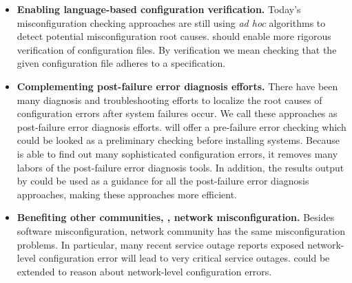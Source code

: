 \begin{itemize}

\item {\bf Enabling language-based configuration verification.}
  Today's misconfiguration checking approaches are still using {\em ad hoc}
  algorithms to detect potential misconfiguration root causes. \app 
  should enable more rigorous verification of configuration files. By verification we
  mean checking that the given configuration file adheres to a
  specification.

\item {\bf Complementing post-failure error diagnosis efforts.}
  There have been many diagnosis and troubleshooting efforts to localize
  the root causes of configuration errors after system failures occur.
  We call these approaches as post-failure error diagnosis efforts.
  \app will offer a pre-failure error checking
  which could be looked as a preliminary checking before installing
  systems. Because \app is able to find out many sophisticated 
  configuration errors, it removes many labors of 
  the post-failure error diagnosis tools. In addition, the results
  output by \app could be used as a guidance for all the post-failure
  error diagnosis approaches, making these approaches more efficient.

\item {\bf Benefiting other communities, \eg, network misconfiguration.} 
  Besides software misconfiguration, network community has the same 
  misconfiguration problems. In particular, many recent service outage 
  reports exposed network-level configuration error will lead to
  very critical service outages. \app could be extended to reason about
  network-level configuration errors.

\end{itemize}

